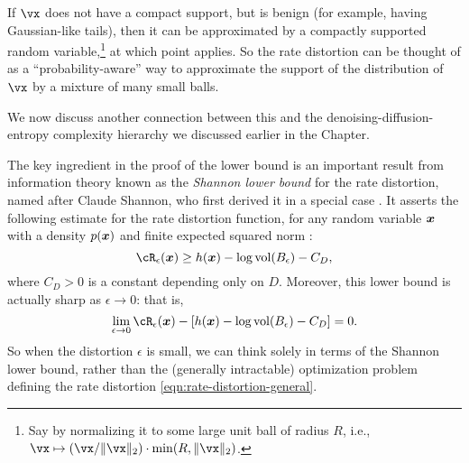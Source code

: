 \documentclass[../../book-main.tex]{subfiles}
\begin{document}
If \(\vx\) does not have a compact support, but is benign (for example, having
Gaussian-like tails), then it can be approximated by a compactly supported
random variable,\footnote{Say by normalizing it to some large unit ball of radius \(R\),
i.e., \(\vx \mapsto (\vx/\norm{\vx}_{2}) \cdot \min(R, \|\vx\|_{2})\).} at which
point  applies. So the rate
distortion can be thought of as a ``probability-aware'' way to approximate the
support of the distribution of
\(\vx\) by a mixture of many small balls.

We now discuss another connection between this and the
denoising-diffusion-entropy complexity hierarchy we discussed earlier in the
Chapter.

\begin{remark}
	The key ingredient in the proof of the lower bound is an important result from
	information theory known as the \textit{Shannon lower bound} for the rate
	distortion, named after Claude Shannon, who first derived it in a special case
	\cite{shannon1959coding}. It
	asserts the following estimate for the rate distortion function, for any random
	variable $\bm{x}$ with
	a density $p(\bm{x})$ and finite expected squared norm \cite{Linder1994-ej}:
	\begin{equation}\label{eq:slb}
		\cR_{\epsilon}(\x)
		\geq
		h(\x)
		- \log \volume(B_{\epsilon})
		-
		C_D,
	\end{equation}
	where $C_D > 0$ is a constant depending only on $D$. Moreover, this lower bound
	is actually sharp as $\epsilon \to 0$: that is,
	\begin{equation}
		\lim_{\epsilon \to 0} \cR_{\epsilon}(\x) - \left[ h(\x) - \log
		\volume(B_{\epsilon}) - C_D\right] = 0.
	\end{equation}
	So when the distortion $\epsilon$ is small, we can think solely in terms of
	the Shannon lower bound, rather than the (generally intractable)
	optimization problem defining the rate distortion
	\eqref{eqn:rate-distortion-general}.


\end{remark}
\end{document}
